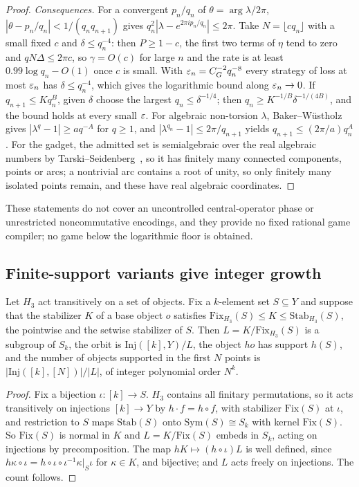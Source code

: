 \begin{proof}
\emph{Consequences.} For a convergent $p_n/q_n$ of $\theta=\arg\lambda/2\pi$, $|\theta-p_n/q_n|<1/(q_nq_{n+1})$ gives
$q_n^2|\lambda-e^{2\pi ip_n/q_n}|\le2\pi$. Take $N=\lfloor cq_n\rfloor$ with a small fixed $c$ and $\delta\le q_n^{-4}$: then $P\ge1-c$, the first two
terms of $\eta$ tend to zero and $qN\Delta\le2\pi c$, so $\gamma=O(c)$ for large $n$ and the rate is at least $0.99\log q_n-O(1)$ once $c$ is
small. With $\varepsilon_n=C_G^{-2}q_n^{-8}$ every strategy of loss at most $\varepsilon_n$ has $\delta\le q_n^{-4}$, which gives the logarithmic bound
along $\varepsilon_n\to0$. If $q_{n+1}\le Kq_n^B$, given $\delta$ choose the largest $q_n\le\delta^{-1/4}$; then $q_n\ge K^{-1/B}\delta^{-1/(4B)}$, and the bound
holds at every small $\varepsilon$. For algebraic non-torsion $\lambda$, Baker--W\"ustholz~\cite{BW93} gives $|\lambda^q-1|\ge aq^{-A}$ for $q\ge1$, and
$|\lambda^{q_n}-1|\le2\pi/q_{n+1}$ yields $q_{n+1}\le(2\pi/a)q_n^A$. For the gadget, the admitted set is semialgebraic over the real algebraic
numbers by Tarski--Seidenberg~\cite{Sei54}, so it has finitely many connected components, points or arcs; a nontrivial arc contains a
root of unity, so only finitely many isolated points remain, and these have real algebraic coordinates.
\end{proof}

These statements do not cover an uncontrolled central-operator phase or unrestricted noncommutative encodings, and they provide no
fixed rational game compiler; no game below the logarithmic floor is obtained.

\subsection{Finite-support variants give integer growth}\label{sec:finite-support}

\begin{proposition}\label{prop:finite-support}
Let $H_3$ act transitively on a set of objects. Fix a $k$-element set $S\subseteq Y$ and suppose that the stabilizer $K$ of a base
object $o$ satisfies $\mathrm{Fix}_{H_3}(S)\le K\le\mathrm{Stab}_{H_3}(S)$, the pointwise and the setwise stabilizer of $S$. Then
$L=K/\mathrm{Fix}_{H_3}(S)$ is a subgroup of $S_k$, the orbit is $\mathrm{Inj}([k],Y)/L$, the object $ho$ has support $h(S)$, and the
number of objects supported in the first $N$ points is $|\mathrm{Inj}([k],[N])|/|L|$, of integer polynomial order $N^k$.
\end{proposition}

\begin{proof}
Fix a bijection $\iota:[k]\to S$. $H_3$ contains all finitary permutations, so it acts transitively on injections $[k]\to Y$ by
$h\cdot f=h\circ f$, with stabilizer $\mathrm{Fix}(S)$ at $\iota$, and restriction to $S$ maps $\mathrm{Stab}(S)$ onto $\mathrm{Sym}(S)\cong S_k$
with kernel $\mathrm{Fix}(S)$. So $\mathrm{Fix}(S)$ is normal in $K$ and $L=K/\mathrm{Fix}(S)$ embeds in $S_k$, acting on injections by
precomposition. The map $hK\mapsto(h\circ\iota)L$ is well defined, since $h\kappa\circ\iota=h\circ\iota\circ\iota^{-1}\kappa|_S\iota$ for
$\kappa\in K$, and bijective; and $L$ acts freely on injections. The count follows.
\end{proof}

